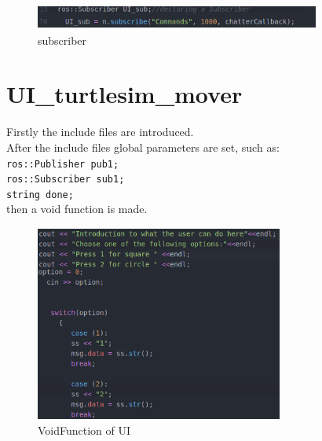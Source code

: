 \begin{figure}[h]
\begin{center}
\includegraphics[width=.9\textwidth]{figures/subscriber.png}
\caption{subscriber}
\end{center}
\end{figure}\label{fig:subscriber}

\section{UI\_turtlesim\_mover}

Firstly the include files are introduced.\\
After the include files global parameters are set, such as:\\
\texttt{ros::Publisher pub1;}\\
\texttt{ros::Subscriber sub1;}\\
\texttt{string done;}\\
then a void function is made.\\

\begin{figure}[h]
\begin{center}
\includegraphics[width=.5\textwidth]{figures/switch.png}
\caption{VoidFunction of UI}
\end{center}
\end{figure}\label{fig:switch}

